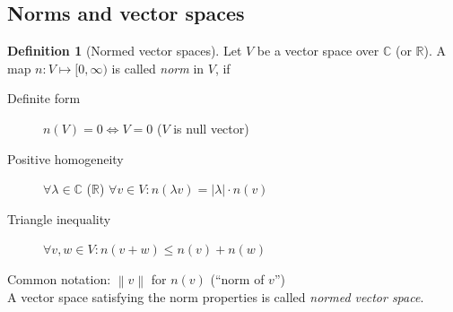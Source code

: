 \documentclass[a4paper,landscape,twocolumn]{article}
\theoremstyle{definition}
\newtheorem{defi}{Definition}
\newcommand\abs[1]{\left|#1\right|}
\newcommand\norm[1]{\left\|#1\right\|}
\begin{document}
\subsection{Norms and vector spaces}
%
%
\begin{defi}[Normed vector spaces]
  Let $V$ be a vector space over $\mathbb C$ (or $\mathbb R$).
  A map $n: V \mapsto [0,\infty)$ is called \emph{norm} in $V$, if
  \begin{description}
    \item[Definite form] $n(V) = 0 \Leftrightarrow V = 0$ ($V$ is null vector)
    \item[Positive homogeneity] $\forall \lambda \in \mathbb C$ ($\mathbb R$) $\forall v \in V: n(\lambda v) = \abs{\lambda} \cdot n(v)$
    \item[Triangle inequality] $\forall v,w \in V: n(v + w) \leq n(v) + n(w)$
  \end{description}
  Common notation: $\norm{v}$ for $n(v)$ (\enquote{norm of $v$}) \\
  A vector space satisfying the norm properties is called \emph{normed vector space}.
\end{defi}
\end{document}
